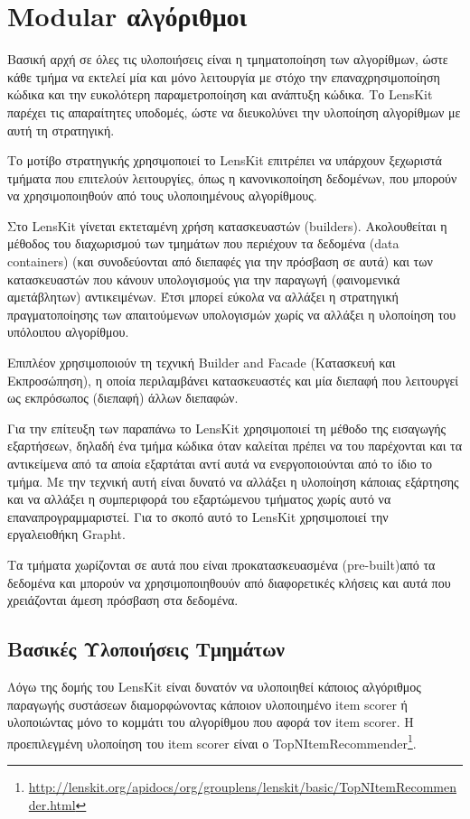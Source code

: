 \section{\en Modular \el αλγόριθμοι}
Βασική αρχή σε όλες τις υλοποιήσεις είναι η τμηματοποίηση των αλγορίθμων, ώστε κάθε τμήμα να εκτελεί μία και μόνο λειτουργία με στόχο την επαναχρησιμοποίηση κώδικα και την ευκολότερη παραμετροποίηση και ανάπτυξη κώδικα. Το \en LensKit \el παρέχει τις απαραίτητες υποδομές, ώστε να διευκολύνει την υλοποίηση αλγορίθμων με αυτή τη στρατηγική. \par Το μοτίβο στρατηγικής \cite{Konstan:2015:TRS:2744768.2728171}χρησιμοποιεί το \en LensKit \el επιτρέπει να υπάρχουν ξεχωριστά τμήματα που επιτελούν λειτουργίες, όπως η κανονικοποίηση δεδομένων, που μπορούν να χρησιμοποιηθούν από τους υλοποιημένους αλγορίθμους. \par
Στο {\en LensKit} γίνεται εκτεταμένη χρήση κατασκευαστών (\en builders)\el. Ακολουθεί\-ται η μέθοδος του διαχωρισμού των τμημάτων που περιέχουν τα δεδομένα (\en data containers) \el (και συνοδεύονται από διεπαφές για την πρόσβαση σε αυτά) και των κατασκευαστών που κάνουν υπολογισμούς για την παραγωγή (φαινομενικά αμετάβλητων) αντικειμένων. Έτσι μπορεί εύκολα να αλλάξει η στρατηγική πραγματοποίησης των απαιτούμενων υπολογισμών χωρίς να αλλάξει η υλοποίηση του υπόλοιπου αλγορίθμου. \par
Επιπλέον χρησιμοποιούν τη τεχνική \en Builder and Facade \el\cite{Gamma:1995:DPE:186897} (Κατασκευή και Εκπροσώπηση), η οποία περιλαμβάνει κατασκευαστές και μία διεπαφή που λειτουργεί ως εκπρόσωπος (διεπαφή) άλλων διεπαφών. \par
Για την επίτευξη των παραπάνω το {\en LensKit} χρησιμοποιεί τη μέθοδο της εισαγωγής εξαρτήσεων\cite{mar96c}, δηλαδή ένα τμήμα κώδικα όταν καλείται πρέπει να του παρέχονται και τα αντικείμενα από τα αποία εξαρτάται αντί αυτά να ενεργοποιούνται από το ίδιο το τμήμα. Με την τεχνική αυτή είναι δυνατό να αλλάξει η υλοποίηση κάποιας εξάρτησης και να αλλάξει η συμπεριφορά του εξαρτώμενου τμήματος χωρίς αυτό να επαναπρογραμμαριστεί. Για το σκοπό αυτό το {\en LensKit} χρησιμοποιεί την εργαλειοθήκη {\en Grapht}. \par
Τα τμήματα χωρίζονται σε αυτά που είναι προκατασκευασμένα (\en pre-built)\el από τα δεδομένα και μπορούν να χρησιμοποιηθουύν από διαφορετικές κλήσεις και αυτά που χρειάζονται άμεση πρόσβαση στα δεδομένα.
\subsection{Βασικές Υλοποιήσεις Τμημάτων}
Λόγω της δομής του \en LensKit \el είναι δυνατόν να υλοποιηθεί κάποιος αλγόριθμος παραγωγής συστάσεων διαμορφώνοντας κάποιον υλοποιημένο \en item scorer \el ή υλοποιώντας μόνο το κομμάτι του αλγορίθμου που αφορά τον \en item scorer. \el H προεπιλεγμένη υλοποίηση του \en item scorer \el είναι ο \en TopNItemRecommender\footnote{\url{http://lenskit.org/apidocs/org/grouplens/lenskit/basic/TopNItemRecommender.html}}. \el
